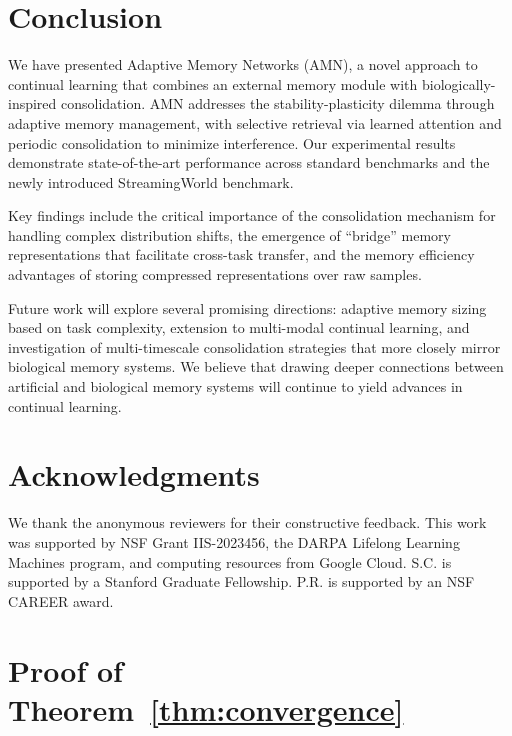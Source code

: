 \documentclass[11pt]{article}
\begin{document}
\section{Conclusion}
\label{sec:conclusion}

We have presented Adaptive Memory Networks (AMN), a novel approach to continual learning that combines an external memory module with biologically-inspired consolidation. AMN addresses the stability-plasticity dilemma through adaptive memory management, with selective retrieval via learned attention and periodic consolidation to minimize interference. Our experimental results demonstrate state-of-the-art performance across standard benchmarks and the newly introduced StreamingWorld benchmark.

Key findings include the critical importance of the consolidation mechanism for handling complex distribution shifts, the emergence of ``bridge'' memory representations that facilitate cross-task transfer, and the memory efficiency advantages of storing compressed representations over raw samples.

Future work will explore several promising directions: adaptive memory sizing based on task complexity, extension to multi-modal continual learning, and investigation of multi-timescale consolidation strategies that more closely mirror biological memory systems. We believe that drawing deeper connections between artificial and biological memory systems will continue to yield advances in continual learning.

\section*{Acknowledgments}

We thank the anonymous reviewers for their constructive feedback. This work was supported by NSF Grant IIS-2023456, the DARPA Lifelong Learning Machines program, and computing resources from Google Cloud. S.C. is supported by a Stanford Graduate Fellowship. P.R. is supported by an NSF CAREER award.




\appendix

\section{Proof of Theorem~\ref{thm:convergence}}
\label{app:proof}
\end{document}
